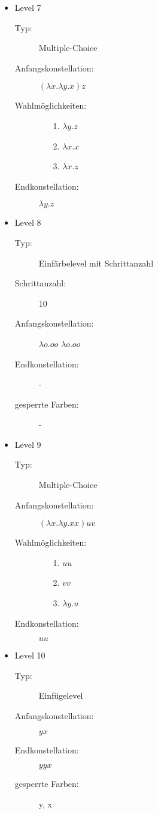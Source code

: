 \documentclass[parskip=full]{scrreprt}
\begin{document}
\begin{itemize}
	\item{Level 7} 
		\begin{description}
			\item[Typ:] Multiple-Choice 
			\item[Anfangskonstellation:] \((\lambda x . \lambda y . x ) z\)    
			\item[Wahlmöglichkeiten:] \hfill
				\begin{itemize}
					\item[1.] \( \lambda y . z\) 
					\item[2.] \( \lambda x . x \) 
					\item[3.] \( \lambda x . z\)
				\end{itemize}
			\item[Endkonstellation:]\( \lambda y . z\)
		\end{description}

	\item{Level 8} 
		\begin{description}
			\item[Typ:] Einfärbelevel mit Schrittanzahl
			\item[Schrittanzahl:] 10
			\item[Anfangskonstellation:] \(\lambda o . o o \)  \(\lambda o . o o \) 
			\item[Endkonstellation:]  -
			\item[gesperrte Farben:] -
		\end{description}

	\item{Level 9} 
		\begin{description}
			\item[Typ:] Multiple-Choice 
			\item[Anfangskonstellation:] \((\lambda x . \lambda y . x x ) u v\)    
			\item[Wahlmöglichkeiten:] \hfill
				\begin{itemize}
					\item[1.] \( u u\) 
					\item[2.] \( v v \) 
					\item[3.] \( \lambda y . u\)
				\end{itemize}
			\item[Endkonstellation:]\(u u\)
		\end{description}
	
	\item{Level 10} 
		\begin{description}
			\item[Typ:] Einfügelevel
			\item[Anfangskonstellation:] \(y x \)    
			\item[Endkonstellation:] \(y y x\)
			\item[gesperrte Farben:] y, x 
		\end{description}


\end{itemize}
\end{document}
